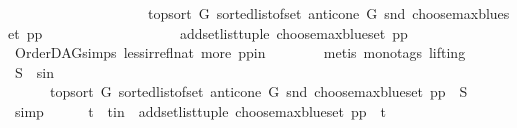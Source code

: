 \begin{isabellebody}
\ \ \ \ \ \ \ \ \ \ \ \ \ \ \ \ \ \ \ \ {\isacharparenleft}{\kern0pt}top{\isacharunderscore}{\kern0pt}sort\ G\ {\isacharparenleft}{\kern0pt}sorted{\isacharunderscore}{\kern0pt}list{\isacharunderscore}{\kern0pt}of{\isacharunderscore}{\kern0pt}set\ {\isacharparenleft}{\kern0pt}anticone\ G\ {\isacharparenleft}{\kern0pt}snd\ {\isacharparenleft}{\kern0pt}choose{\isacharunderscore}{\kern0pt}max{\isacharunderscore}{\kern0pt}blue{\isacharunderscore}{\kern0pt}set\ pp{\isacharparenright}{\kern0pt}{\isacharparenright}{\kern0pt}{\isacharparenright}{\kern0pt}{\isacharparenright}{\kern0pt}{\isacharparenright}{\kern0pt}\isanewline
\ \ \ \ \ \ \ \ \ \ \ \ \ \ \ \ \ \ \ {\isacharparenleft}{\kern0pt}add{\isacharunderscore}{\kern0pt}set{\isacharunderscore}{\kern0pt}list{\isacharunderscore}{\kern0pt}tuple\ {\isacharparenleft}{\kern0pt}choose{\isacharunderscore}{\kern0pt}max{\isacharunderscore}{\kern0pt}blue{\isacharunderscore}{\kern0pt}set\ pp{\isacharparenright}{\kern0pt}{\isacharparenright}{\kern0pt}{\isacharparenright}{\kern0pt}{\isacharparenright}{\kern0pt}{\isachardoublequoteclose}\isanewline
\ \ \ \ \ \ \isamarkupfalse%
\ OrderDAG{\isachardot}{\kern0pt}simps\ less{\isacharunderscore}{\kern0pt}irrefl{\isacharunderscore}{\kern0pt}nat\ more\ pp{\isacharunderscore}{\kern0pt}in\isanewline
\ \ \ \ \ \ \isamarkupfalse%
\ {\isacharparenleft}{\kern0pt}metis\ {\isacharparenleft}{\kern0pt}mono{\isacharunderscore}{\kern0pt}tags{\isacharcomma}{\kern0pt}\ lifting{\isacharparenright}{\kern0pt}{\isacharparenright}{\kern0pt}\isanewline
\ \ \ \ \isamarkupfalse%
\ S\ \ s{\isacharunderscore}{\kern0pt}in{\isacharcolon}{\kern0pt}\ \isanewline
\ \ \ \ \ \ {\isachardoublequoteopen}{\isacharparenleft}{\kern0pt}top{\isacharunderscore}{\kern0pt}sort\ G\ {\isacharparenleft}{\kern0pt}sorted{\isacharunderscore}{\kern0pt}list{\isacharunderscore}{\kern0pt}of{\isacharunderscore}{\kern0pt}set\ {\isacharparenleft}{\kern0pt}anticone\ G\ {\isacharparenleft}{\kern0pt}snd\ {\isacharparenleft}{\kern0pt}choose{\isacharunderscore}{\kern0pt}max{\isacharunderscore}{\kern0pt}blue{\isacharunderscore}{\kern0pt}set\ pp{\isacharparenright}{\kern0pt}{\isacharparenright}{\kern0pt}{\isacharparenright}{\kern0pt}{\isacharparenright}{\kern0pt}{\isacharparenright}{\kern0pt}\ {\isacharequal}{\kern0pt}\ S{\isachardoublequoteclose}\ \isamarkupfalse%
\ simp\isanewline
\ \ \ \ \isamarkupfalse%
\ t\ \ t{\isacharunderscore}{\kern0pt}in\ {\isacharcolon}{\kern0pt}\ {\isachardoublequoteopen}{\isacharparenleft}{\kern0pt}add{\isacharunderscore}{\kern0pt}set{\isacharunderscore}{\kern0pt}list{\isacharunderscore}{\kern0pt}tuple\ {\isacharparenleft}{\kern0pt}choose{\isacharunderscore}{\kern0pt}max{\isacharunderscore}{\kern0pt}blue{\isacharunderscore}{\kern0pt}set\ pp{\isacharparenright}{\kern0pt}{\isacharparenright}{\kern0pt}\ {\isacharequal}{\kern0pt}\ t{\isachardoublequoteclose}\ \isamarkupfalse%

\end{isabellebody}
